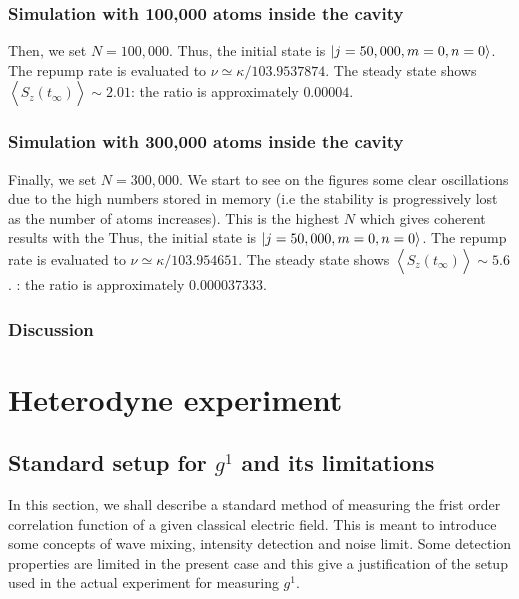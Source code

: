 \documentclass[11pt]{report}
\DeclarePairedDelimiter\ket{\lvert}{\rangle}
\begin{document}
\subsection{Simulation with 100,000 atoms inside the cavity}

Then, we set $N=100,000$. Thus, the initial state is $\ket{j=50,000, m=0, n=0}$. The repump rate is evaluated to $\nu \simeq \kappa / 103.9537874$. The steady state shows $\left\langle \hat{S}_z(t_\infty) \right\rangle \sim 2.01$: the ratio is approximately $0.00004$.

\subsection{Simulation with 300,000 atoms inside the cavity}

Finally, we set $N=300,000$. We start to see on the figures some clear oscillations due to the high numbers stored in memory (i.e the stability is progressively lost as the number of atoms increases). This is the highest $N$ which gives coherent results with the  Thus, the initial state is $\ket{j=50,000, m=0, n=0}$. The repump rate is evaluated to $\nu \simeq \kappa / 103.954651$. The steady state shows $\left\langle \hat{S}_z(t_\infty) \right\rangle \sim 5.6$. : the ratio is approximately $0.000037333$.

\subsection{Discussion}

\chapter{Heterodyne experiment}
\section{Standard setup for $g^1$ and its limitations}

In this section, we shall describe a standard method of measuring the frist order correlation function of a given classical electric field. This is meant to introduce some concepts of wave mixing, intensity detection and noise limit. Some detection properties are limited in the present case and this give a justification of the setup used in the actual experiment for measuring $g^1$.
\end{document}
